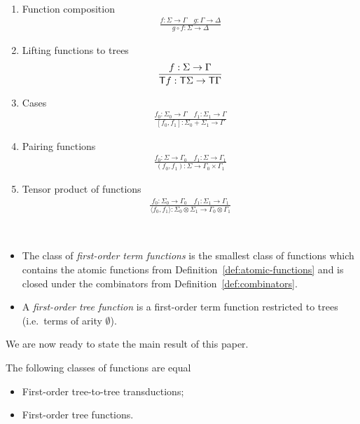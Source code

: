 \begin{definition}
     [Combinators] \label{def:combinators} \ 
    \begin{enumerate}
    \item Function composition
    \begin{align*}
    \frac{f : \Sigma \to \Gamma \quad g : \Gamma \to \Delta} {g \circ f : \Sigma \to \Delta}
\end{align*}

\item Lifting functions to trees
\begin{align*}
    \frac{f : \Sigma \to \Gamma} {\mathsf T f : \mathsf T \Sigma \to \mathsf T \Gamma}
\end{align*}
\item Cases
\begin{align*}
    \frac{f_0 : \Sigma_0 \to \Gamma \quad f_1 : \Sigma_1 \to \Gamma} {[f_0,f_1] : \Sigma_0 + \Sigma_1 \to \Gamma}
\end{align*}

\item Pairing functions
\begin{align*}
    \frac{f_0 : \Sigma \to \Gamma_0 \quad f_1 : \Sigma \to \Gamma_1} {(f_0,f_1) : \Sigma \to \Gamma_0 \times \Gamma_1}
\end{align*}

\item Tensor product of functions
\begin{align*}
    \frac{f_0 : \Sigma_0 \to \Gamma_0 \quad f_1 : \Sigma_1 \to \Gamma_1} {\langle f_0,f_1 \rangle : \Sigma_0 \otimes \Sigma_1 \to \Gamma_0 \otimes \Gamma_1}
\end{align*}
\end{enumerate}
\end{definition}

\begin{definition} \label{def:fo-tree-functions} \ 
    \begin{itemize}
        \item The class of \emph{first-order term functions} is the smallest class of functions which contains the atomic functions from Definition~\ref{def:atomic-functions} and is closed under the combinators from Definition~\ref{def:combinators}.
        \item  A \emph{first-order tree function} is a first-order term function restricted to trees (i.e.~terms of arity $\emptyset$).
    \end{itemize}    
\end{definition}


We are now ready to state the main result of this paper. 
\begin{theorem}\label{thm:main}
    The following classes of functions are equal\begin{itemize}
        \item First-order tree-to-tree transductions;
        \item First-order tree functions.
    \end{itemize}
\end{theorem}
